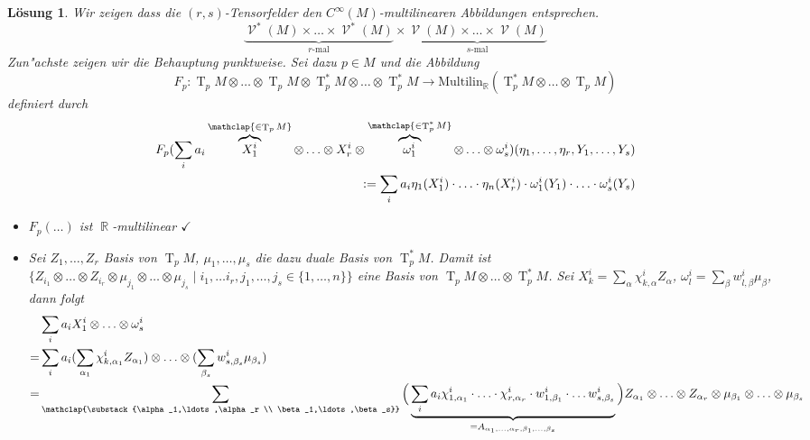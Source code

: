 \documentclass[paper=A4, twoside, chapterprefix=true, bibliography=totoc, headsepline]{scrbook}
\DeclareMathOperator{\R}{\mathbb{R}}
\DeclareMathOperator{\calV}{\mathcal{V}}
\DeclareMathOperator{\T}{T} %
\newcommand{\X}{\times}
\theoremstyle{plain}
\theoremstyle{nonumberplain}
\theoremstyle{empty}
\theoremstyle{break}
\newtheorem{Loes}{L\"osung}
\begin{document}
\begin{Loes}\label{exc:ueb5-a1}
Wir zeigen dass die $(r,s)$-Tensorfelder den $C^\infty(M)$-multilinearen Abbildungen entsprechen.
	\[ \underbrace{\calV^*(M) \X \ldots \X \calV^*(M)}_{r\text{-mal}} \X \underbrace{\calV(M) \X \ldots \X \calV(M)}_{s\text{-mal}} \]
Zun"achste zeigen wir die Behauptung punktweise. Sei dazu $p \in M$ und die Abbildung
	\[ F_p: \T_pM \otimes \ldots \otimes \T_pM \otimes \T_p^*M \otimes \ldots \otimes \T_p^*M \to \text{Multilin}_{\R}(\T_p^*M \otimes \ldots \otimes \T_pM) \]
definiert durch
\begin{align*}
	F_p(\sum_i a_i \overbrace{X_1^{i}}^{\mathclap{\in \T_pM}} \otimes \ldots \otimes X_r^{i} \otimes \overbrace{\omega_1^{i}}^{\mathclap{\in \T_p^*M}} \otimes \ldots \otimes \omega_s^{i})(\eta_1,\ldots ,\eta_r, Y_1, \ldots ,Y_s)\\
	\qquad := \sum_i a_i \eta_1(X_1^{i}) \cdot \ldots \cdot \eta_n(X_r^{i}) \cdot \omega_1^{i}(Y_1) \cdot \ldots \cdot \omega_s^{i}(Y_s)
\end{align*}
\begin{description}[leftmargin=*]
\item[$\bm{F_p}$ ist wohldefiniert:]
	\begin{itemize}[leftmargin=*]
		\item
			$F_p(\ldots)$ ist $\R$-multilinear $\checkmark$
		\item
			Sei $Z_1,\ldots ,Z_r$ Basis von $\T_pM$, $\mu_1,\ldots ,\mu_s$ die dazu duale Basis von $\T_p^*M$. Damit ist $\{Z_{i_1} \otimes \ldots \otimes Z_{i_r} \otimes \mu_{j_1} \otimes \ldots \otimes \mu_{j_s} \mid i_1, \ldots i_r, j_1, \ldots , j_s \in \{1,\ldots ,n\}\}$ eine Basis von $\T_pM \otimes \ldots \otimes \T_p^*M$. Sei $X_k^{i} = \sum_\alpha \chi_{k, \alpha}^{i} Z_\alpha$, $\omega_l^{i} = \sum_\beta w_{l, \beta}^{i} \mu_\beta$, dann folgt
			\begin{align*}
				& \sum_i a_i X_1^{i} \otimes \ldots \otimes \omega_s^{i}\\
				=& \sum_i a_i (\sum_{\alpha_1} \chi_{k, \alpha_1}^{i} Z_{\alpha_1}) \otimes \ldots  \otimes (\sum_{\beta_s} w_{s, \beta_s}^{i} \mu_{\beta_s})\\
				=& \sum_{\mathclap{\substack{\alpha_1,\ldots ,\alpha_r \\ \beta_1,\ldots ,\beta_s}}} \Big( \underbrace{\sum_i a_i \chi_{1,\alpha_1}^{i} \cdot \ldots \cdot \chi_{r,\alpha_r}^{i} \cdot w_{1, \beta_1}^{i} \cdot \ldots w_{s, \beta_s}^{i} }_{= A_{\alpha_1,\ldots , \alpha_r, \beta_1, \ldots ,\beta_s}} \Big) Z_{\alpha_1} \otimes \ldots \otimes Z_{\alpha_r} \otimes \mu_{\beta_1} \otimes \ldots \otimes \mu_{\beta_s}

\end{align*}
\end{itemize}
\end{description}
\end{Loes}
\end{document}
